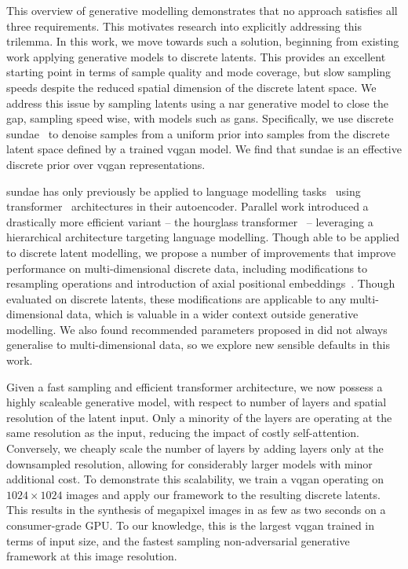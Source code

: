 This overview of generative modelling demonstrates that no approach satisfies
all three requirements. This motivates research into explicitly addressing this
trilemma. In this work, we move towards such a solution, beginning from existing
work applying generative models to discrete latents. This provides an excellent
starting point in terms of sample quality and mode coverage, but slow sampling
speeds despite the reduced spatial dimension of the discrete latent space. We
address this issue by sampling latents using a \gls{nar} generative model to
close the gap, sampling speed wise, with models such as \glspl{gan}.
Specifically, we use discrete \gls{sundae}~\cite{savinov2022stepunrolled} to
denoise samples from a uniform prior into samples from the discrete
latent space defined by a trained \gls{vqgan} model. We find that
\gls{sundae} is an effective discrete prior over \gls{vqgan} representations.

\Gls{sundae} has only previously be applied to language modelling
tasks~\cite{savinov2022stepunrolled} using
transformer~\cite{vaswani2017attention} architectures in their autoencoder.
Parallel work introduced a drastically more efficient variant -- the hourglass
transformer~\cite{nawrot2021hierarchical} -- leveraging a hierarchical
architecture targeting language modelling. Though able to be applied to discrete
latent modelling, we propose a number of improvements that improve performance on
multi-dimensional discrete data, including modifications to resampling
operations and introduction of axial positional
embeddings~\cite{su2021roformer}. Though evaluated on discrete latents, these
modifications are applicable to any multi-dimensional data,
which is valuable in a wider context outside generative modelling. We
also found recommended parameters proposed in \citet{savinov2022stepunrolled}
did not always generalise to multi-dimensional data, so we explore new sensible
defaults in this work.

Given a fast sampling and efficient transformer architecture, we now possess a
highly scaleable generative model, with respect to number of layers and spatial
resolution of the latent input. Only a minority of the layers are operating at
the same resolution as the input, reducing the impact of costly self-attention.
Conversely, we cheaply scale the number of layers by adding layers only at the
downsampled resolution, allowing for considerably larger models with minor
additional cost. To demonstrate this scalability, we train a \gls{vqgan}
operating on $1024 \times 1024$ images and apply our framework to the resulting
discrete latents. This results in the synthesis of megapixel images in as few as
two seconds on a consumer-grade GPU. To our knowledge, this is the largest
\gls{vqgan} trained in terms of input size, and the fastest sampling
non-adversarial generative framework at this image resolution.

